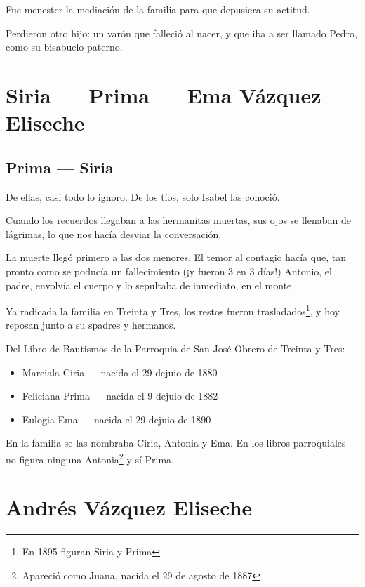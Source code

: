 \documentclass{article}
\begin{document}
Fue menester la mediación de la familia para que depusiera su actitud.

\bigbreak{}

Perdieron otro hijo: un varón que falleció al nacer, y que iba a ser llamado Pedro, como su bisabuelo paterno.

\section{Siria --- Prima --- Ema Vázquez Eliseche}

\subsection{Prima --- Siria}

De ellas, casi todo lo ignoro. De los tíos, solo Isabel las conoció.

Cuando los recuerdos llegaban a las hermanitas muertas, sus ojos se llenaban de lágrimas, lo que nos hacía desviar la conversación.

La muerte llegó primero a las dos menores. El temor al contagio hacía que, tan pronto como se poducía un fallecimiento (¡y fueron 3 en 3 días!) Antonio, el padre, envolvía el cuerpo y lo sepultaba de inmediato, en el monte.

Ya radicada la familia en Treinta y Tres, los restos fueron trasladados\footnote{En 1895 figuran Siria y Prima}, y hoy reposan junto a su spadres y hermanos.

\bigbreak{}

Del Libro de Bautismos de la Parroquia de San José Obrero de Treinta y Tres:

\begin{itemize}
    \item{Marciala Ciria --- nacida el 29 dejuio de 1880}
    \item{Feliciana Prima --- nacida el 9 dejuio de 1882}
    \item{Eulogia Ema --- nacida el 29 dejuio de 1890}
\end{itemize}

En la familia se las nombraba Ciria, Antonia y Ema. En los libros parroquiales no figura ninguna Antonia\footnote{Apareció como Juana, nacida el 29 de agosto de 1887} y sí Prima.

\section{Andrés Vázquez Eliseche}
\end{document}
